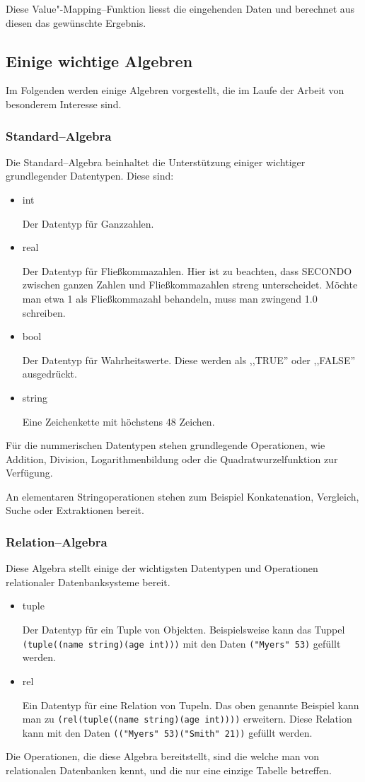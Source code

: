  Diese Value"-Mapping--Funktion liesst die eingehenden Daten und berechnet aus diesen das gewünschte Ergebnis.


\subsection{Einige wichtige Algebren}

Im Folgenden werden einige Algebren vorgestellt, die im Laufe der Arbeit von besonderem Interesse sind. 

\subsubsection{Standard--Algebra}
Die Standard--Algebra beinhaltet die Unterstützung einiger wichtiger grundlegender Datentypen. Diese sind:
\begin{itemize}
\item int

Der Datentyp für Ganzzahlen.
\item real

Der Datentyp für Fließkommazahlen. Hier ist zu beachten, dass SECONDO zwischen ganzen Zahlen und Fließkommazahlen streng unterscheidet. Möchte man etwa 1 als Fließkommazahl behandeln, muss man zwingend 1.0 schreiben.
\item bool

Der Datentyp für Wahrheitswerte. Diese werden als ,,TRUE'' oder ,,FALSE'' ausgedrückt.
\item string

Eine Zeichenkette mit höchstens 48 Zeichen. 
\end{itemize}

Für die nummerischen Datentypen stehen grundlegende Operationen, wie Addition, Division, Logarithmenbildung oder die Quadratwurzelfunktion zur Verfügung.

An elementaren Stringoperationen stehen zum Beispiel Konkatenation, Vergleich, Suche oder Extraktionen bereit.

\subsubsection{Relation--Algebra}

Diese Algebra stellt einige der wichtigsten Datentypen und Operationen relationaler Datenbanksysteme bereit.
 
\begin{itemize}
\item tuple

Der Datentyp für ein Tuple von Objekten. Beispielsweise kann das Tuppel\\ \verb+(tuple((name string)(age int)))+ mit den Daten \verb+("Myers" 53)+ gefüllt werden.
\item rel

Ein Datentyp für eine Relation von Tupeln. Das oben genannte Beispiel kann man zu \verb+(rel(tuple((name string)(age int))))+ erweitern. Diese Relation kann mit den Daten \verb+(("Myers" 53)("Smith" 21))+ gefüllt werden.
\end{itemize}
Die Operationen, die diese Algebra bereitstellt, sind die welche man von relationalen Datenbanken kennt, und die nur eine einzige Tabelle betreffen.

